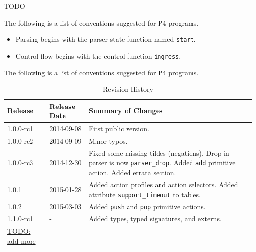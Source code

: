 \documentclass[12pt]{article}
\begin{document}

TODO


The following is a list of conventions suggested for P4 programs.

\begin{itemize}
\item
Parsing begins with the parser state function named \texttt{start}.
\item
Control flow begins with the control function \texttt{ingress}.
\end{itemize}The following is a list of conventions suggested for P4 programs.


\begin{table}[H]
\begin{center}
\begin{tabular}{| l | l | p{} |} \hline
\textbf{Release} &
\textbf{Release Date} &
\textbf{Summary of Changes} \\  \hline
1.0.0-rc1 & 2014-09-08 & First public version. \\  \hline
1.0.0-rc2 & 2014-09-09 & Minor typos. \\  \hline
1.0.0-rc3 & 2014-12-30 & Fixed some missing tildes (negations). Drop in parser is now \texttt{parser_drop}. Added \texttt{add} primitive action. Added errata section. \\  \hline
1.0.1 & 2015-01-28 & Added action profiles and action selectors. Added attribute \texttt{support_timeout} to tables. \\  \hline
1.0.2 & 2015-03-03 & Added \texttt{push} and \texttt{pop} primitive actions. \\  \hline
1.1.0-rc1 & - & Added types, typed signatures, and externs. \\  \hline 
\underline{TODO: add more} \\ \hline
\end{tabular}
\end{center}
\caption{Revision History}
\label{tab:revhistory}
\end{table}


\end{document}
